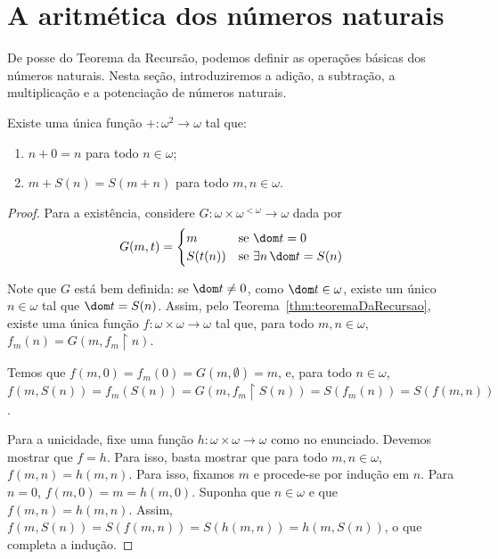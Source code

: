 \section{A aritmética dos números naturais}\label{sec:aritmeticaDosNaturais}
De posse do Teorema da Recursão, podemos definir as operações básicas dos números naturais.
Nesta seção, introduziremos a adição, a subtração, a multiplicação e a potenciação de números naturais.

\begin{proposition}[$Z^-$]\label{prop:existenciaDaAdicao}
    Existe uma única função $+: \omega^2\to \omega$ tal que:
    \begin{enumerate}[label=(\roman*)]
        \item $n+0=n$ para todo $n \in \omega$;
        \item $m+S(n)=S(m+n)$ para todo $m, n \in \omega$.
    \end{enumerate}
\end{proposition}
\begin{proof}
    Para a existência, considere $G:\omega\times \omega^{<\omega}\to \omega$ dada por
    \[G(m, t)=\begin{cases}
        m & \text{se } \dom t = 0\\
        S(t(n)) & \text{se } \exists n \,\dom t = S(n)
    \end{cases}
    \]

    Note que $G$ está bem definida: se $\dom t\neq 0$, como $\dom t\in\omega$, existe um único
    $n\in\omega$ tal que $\dom t=S(n)$.
    Assim, pelo Teorema~\ref{thm:teoremaDaRecursao}, existe uma única função $f:\omega\times \omega\to \omega$ tal que, para todo $m, n \in \omega$, $f_m(n)=G(m, f_m\restriction n)$.

    Temos que $f(m, 0)=f_m(0)=G(m, \emptyset)=m$, e, para todo $n \in \omega$, $f(m, S(n))=f_m(S(n))=G(m, f_m\restriction S(n))=S(f_m(n))=S(f(m, n))$.

    Para a unicidade, fixe uma função $h:\omega\times \omega\to \omega$ como no enunciado.
    Devemos mostrar que $f=h$.
    Para isso, basta mostrar que para todo $m, n \in \omega$, $f(m, n)=h(m, n)$.
    Para isso, fixamos $m$ e procede-se por indução em $n$.
    Para $n=0$, $f(m, 0)=m=h(m, 0)$.
    Suponha que $n\in \omega$ e que $f(m, n)=h(m, n)$.
    Assim, $f(m, S(n))=S(f(m, n))=S(h(m, n))=h(m, S(n))$, o que completa a indução.
\end{proof}

